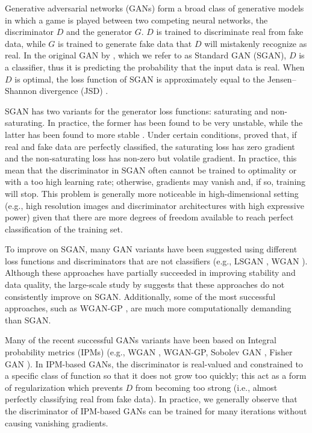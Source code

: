 \documentclass{article}
\begin{document}
Generative adversarial networks (GANs) \citep{hong2017generative} form a broad class of generative models in which a game is played between two competing neural networks, the discriminator $D$ and the generator $G$. $D$ is trained to discriminate real from fake data, while $G$ is trained to generate fake data that $D$ will mistakenly recognize as real. In the original GAN by \citet{GAN}, which we refer to as Standard GAN (SGAN), $D$ is a classifier, thus it is predicting the probability that the input data is real. When $D$ is optimal, the loss function of SGAN is approximately equal to the Jensen–Shannon divergence (JSD) \citep{GAN}. 

SGAN has two variants for the generator loss functions: saturating and non-saturating. In practice, the former has been found to be very unstable, while the latter has been found to more stable \citep{GAN}. Under certain conditions, \citet{GANTheorems} proved that, if real and fake data are perfectly classified, the saturating loss has zero gradient and the non-saturating loss has non-zero but volatile gradient. In practice, this mean that the discriminator in SGAN often cannot be trained to optimality or with a too high learning rate; otherwise, gradients may vanish and, if so, training will stop. This problem is generally more noticeable in high-dimensional setting (e.g., high resolution images and discriminator architectures with high expressive power) given that there are more degrees of freedom available to reach perfect classification of the training set.

To improve on SGAN, many GAN variants have been suggested using different loss functions and discriminators that are not classifiers (e.g., LSGAN \citep{LSGAN}, WGAN \citep{WGAN}). Although these approaches have partially succeeded in improving stability and data quality, the large-scale study by \citet{lucic2017gans} suggests that these approaches do not consistently improve on SGAN. Additionally, some of the most successful approaches, such as WGAN-GP \citep{WGAN-GP}, are much more computationally demanding than SGAN.

Many of the recent successful GANs variants have been based on Integral probability metrics (IPMs) \citep{muller1997integral} (e.g., WGAN \citep{WGAN}, WGAN-GP\citep{WGAN-GP}, Sobolev GAN \citep{mroueh2017sobolev}, Fisher GAN \citep{Fisher}). In IPM-based GANs, the discriminator is real-valued and constrained to a specific class of function so that it does not grow too quickly; this act as a form of regularization which prevents $D$ from becoming too strong (i.e., almost perfectly classifying real from fake data). In practice, we generally observe that the discriminator of IPM-based GANs can be trained for many iterations without causing vanishing gradients. 
 
\end{document}
